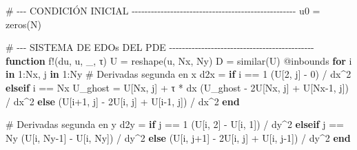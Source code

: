 \documentclass[
  spanish,
  us-letterpaper,
]{scrreprt}
\newenvironment{Shaded}{\begin{snugshade}}{\end{snugshade}}
\newcommand{\CommentTok}[1]{\textcolor[rgb]{0.37,0.37,0.37}{#1}}
\newcommand{\ControlFlowTok}[1]{\textcolor[rgb]{0.00,0.23,0.31}{\textbf{#1}}}
\newcommand{\FloatTok}[1]{\textcolor[rgb]{0.68,0.00,0.00}{#1}}
\newcommand{\FunctionTok}[1]{\textcolor[rgb]{0.28,0.35,0.67}{#1}}
\newcommand{\KeywordTok}[1]{\textcolor[rgb]{0.00,0.23,0.31}{\textbf{#1}}}
\newcommand{\NormalTok}[1]{\textcolor[rgb]{0.00,0.23,0.31}{#1}}
\newcommand{\OperatorTok}[1]{\textcolor[rgb]{0.37,0.37,0.37}{#1}}
\newcommand{\PreprocessorTok}[1]{\textcolor[rgb]{0.68,0.00,0.00}{#1}}
\theoremstyle{plain}
\theoremstyle{definition}
\theoremstyle{remark}
\begin{document}
\begin{Shaded}
\begin{Highlighting}[]
\CommentTok{\# {-}{-}{-} CONDICIÓN INICIAL {-}{-}{-}{-}{-}{-}{-}{-}{-}{-}{-}{-}{-}{-}{-}{-}{-}{-}{-}{-}{-}{-}{-}{-}{-}{-}{-}{-}{-}{-}{-}{-}{-}{-}{-}{-}{-}{-}{-}{-}{-}{-}{-}{-}{-}{-}{-}{-}{-}{-}{-}}
\NormalTok{u0 }\OperatorTok{=} \FunctionTok{zeros}\NormalTok{(N)}

\CommentTok{\# {-}{-}{-} SISTEMA DE EDOs DEL PDE {-}{-}{-}{-}{-}{-}{-}{-}{-}{-}{-}{-}{-}{-}{-}{-}{-}{-}{-}{-}{-}{-}{-}{-}{-}{-}{-}{-}{-}{-}{-}{-}{-}{-}{-}{-}{-}{-}{-}{-}{-}{-}{-}{-}{-}}
\KeywordTok{function} \FunctionTok{f!}\NormalTok{(du, u, \_, τ)}
\NormalTok{    U }\OperatorTok{=} \FunctionTok{reshape}\NormalTok{(u, Nx, Ny)}
\NormalTok{    D }\OperatorTok{=} \FunctionTok{similar}\NormalTok{(U)}
    \PreprocessorTok{@inbounds} \ControlFlowTok{for}\NormalTok{ i }\KeywordTok{in} \FloatTok{1}\OperatorTok{:}\NormalTok{Nx, j }\KeywordTok{in} \FloatTok{1}\OperatorTok{:}\NormalTok{Ny}
        \CommentTok{\# Derivadas segunda en x}
\NormalTok{        d2x }\OperatorTok{=} \ControlFlowTok{if}\NormalTok{ i }\OperatorTok{==} \FloatTok{1}
\NormalTok{            (U[}\FloatTok{2}\NormalTok{, j] }\OperatorTok{{-}} \FloatTok{0}\NormalTok{) }\OperatorTok{/}\NormalTok{ dx}\OperatorTok{\^{}}\FloatTok{2}
        \ControlFlowTok{elseif}\NormalTok{ i }\OperatorTok{==}\NormalTok{ Nx}
\NormalTok{            U\_ghost }\OperatorTok{=}\NormalTok{ U[Nx, j] }\OperatorTok{+}\NormalTok{ τ }\OperatorTok{*}\NormalTok{ dx}
\NormalTok{            (U\_ghost }\OperatorTok{{-}} \FloatTok{2}\NormalTok{U[Nx, j] }\OperatorTok{+}\NormalTok{ U[Nx}\OperatorTok{{-}}\FloatTok{1}\NormalTok{, j]) }\OperatorTok{/}\NormalTok{ dx}\OperatorTok{\^{}}\FloatTok{2}
        \ControlFlowTok{else}
\NormalTok{            (U[i}\OperatorTok{+}\FloatTok{1}\NormalTok{, j] }\OperatorTok{{-}} \FloatTok{2}\NormalTok{U[i, j] }\OperatorTok{+}\NormalTok{ U[i}\OperatorTok{{-}}\FloatTok{1}\NormalTok{, j]) }\OperatorTok{/}\NormalTok{ dx}\OperatorTok{\^{}}\FloatTok{2}
        \ControlFlowTok{end}

        \CommentTok{\# Derivadas segunda en y}
\NormalTok{        d2y }\OperatorTok{=} \ControlFlowTok{if}\NormalTok{ j }\OperatorTok{==} \FloatTok{1}
\NormalTok{            (U[i, }\FloatTok{2}\NormalTok{] }\OperatorTok{{-}}\NormalTok{ U[i, }\FloatTok{1}\NormalTok{]) }\OperatorTok{/}\NormalTok{ dy}\OperatorTok{\^{}}\FloatTok{2}
        \ControlFlowTok{elseif}\NormalTok{ j }\OperatorTok{==}\NormalTok{ Ny}
\NormalTok{            (U[i, Ny}\OperatorTok{{-}}\FloatTok{1}\NormalTok{] }\OperatorTok{{-}}\NormalTok{ U[i, Ny]) }\OperatorTok{/}\NormalTok{ dy}\OperatorTok{\^{}}\FloatTok{2}
        \ControlFlowTok{else}
\NormalTok{            (U[i, j}\OperatorTok{+}\FloatTok{1}\NormalTok{] }\OperatorTok{{-}} \FloatTok{2}\NormalTok{U[i, j] }\OperatorTok{+}\NormalTok{ U[i, j}\OperatorTok{{-}}\FloatTok{1}\NormalTok{]) }\OperatorTok{/}\NormalTok{ dy}\OperatorTok{\^{}}\FloatTok{2}
        \ControlFlowTok{end}


\end{Highlighting}
\end{Shaded}
\end{document}
